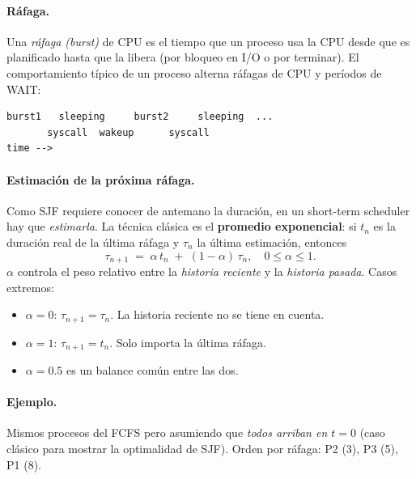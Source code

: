 \documentclass[11pt,a4paper]{article}
\begin{document}
\paragraph{Ráfaga.} Una \emph{ráfaga (burst)} de CPU es el tiempo que
un proceso usa la CPU desde que es planificado hasta que la libera
(por bloqueo en I/O o por terminar). El comportamiento típico de un
proceso alterna ráfagas de CPU y períodos de WAIT:

\begin{lstlisting}[style=textstyle]
burst1   sleeping     burst2     sleeping  ...
       syscall  wakeup      syscall
time -->
\end{lstlisting}

\paragraph{Estimación de la próxima ráfaga.} Como SJF requiere conocer
de antemano la duración, en un short-term scheduler hay que
\emph{estimarla}. La técnica clásica es el \textbf{promedio
exponencial}: si $t_n$ es la duración real de la última ráfaga y
$\tau_n$ la última estimación, entonces
\[
\tau_{n+1} \;=\; \alpha \, t_n \;+\; (1 - \alpha) \, \tau_n,
\quad 0 \le \alpha \le 1.
\]
$\alpha$ controla el peso relativo entre la \emph{historia reciente} y
la \emph{historia pasada}. Casos extremos:
\begin{itemize}[leftmargin=*,nosep]
    \item $\alpha = 0$: $\tau_{n+1} = \tau_n$. La historia reciente
        no se tiene en cuenta.
    \item $\alpha = 1$: $\tau_{n+1} = t_n$. Solo importa la última
        ráfaga.
    \item $\alpha = 0.5$ es un balance común entre las dos.
\end{itemize}

\paragraph{Ejemplo.} Mismos procesos del FCFS pero asumiendo que
\emph{todos arriban en $t = 0$} (caso clásico para mostrar la
optimalidad de SJF). Orden por ráfaga: P2 (3), P3 (5), P1 (8).

\begin{center}
\end{center}
\end{document}
